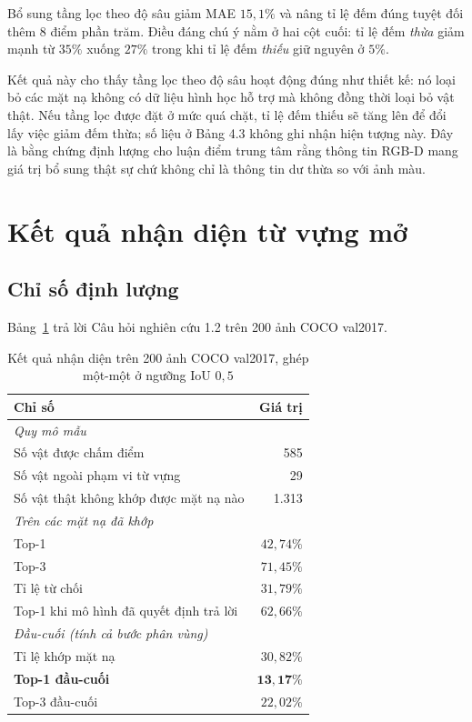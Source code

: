 Bổ sung tầng lọc theo độ sâu giảm MAE $15{,}1\%$ và nâng tỉ lệ đếm đúng tuyệt đối thêm 8 điểm
phần trăm. Điều đáng chú ý nằm ở hai cột cuối: tỉ lệ đếm \emph{thừa} giảm mạnh từ $35\%$ xuống
$27\%$ trong khi tỉ lệ đếm \emph{thiếu} giữ nguyên ở $5\%$.

Kết quả này cho thấy tầng lọc theo độ sâu hoạt động đúng như thiết kế: nó loại bỏ các mặt nạ không có dữ liệu hình học hỗ trợ mà không đồng thời loại bỏ vật thật. Nếu tầng lọc được đặt ở mức quá chặt, tỉ lệ đếm thiếu sẽ tăng lên để đổi lấy việc giảm đếm thừa; số liệu ở Bảng 4.3 không ghi nhận hiện tượng này. Đây
là bằng chứng định lượng cho luận điểm trung tâm rằng thông tin RGB-D mang giá trị bổ sung thật
sự chứ không chỉ là thông tin dư thừa so với ảnh màu.

\section{Kết quả nhận diện từ vựng mở}

\subsection{Chỉ số định lượng}

Bảng~\ref{tab:nhan_dien} trả lời Câu hỏi nghiên cứu 1.2 trên 200 ảnh COCO val2017.

\begin{table}[H]
\centering
\caption{Kết quả nhận diện trên 200 ảnh COCO val2017, ghép một-một ở ngưỡng IoU $0{,}5$}
\label{tab:nhan_dien}
\small
\begin{tabularx}{\textwidth}{X r}
\toprule
\textbf{Chỉ số} & \textbf{Giá trị} \\
\midrule
\multicolumn{2}{l}{\textit{Quy mô mẫu}} \\
Số vật được chấm điểm & 585 \\
Số vật ngoài phạm vi từ vựng & 29 \\
Số vật thật không khớp được mặt nạ nào & 1.313 \\
\midrule
\multicolumn{2}{l}{\textit{Trên các mặt nạ đã khớp}} \\
Top-1 & $42{,}74\%$ \\
Top-3 & $71{,}45\%$ \\
Tỉ lệ từ chối & $31{,}79\%$ \\
Top-1 khi mô hình đã quyết định trả lời & $62{,}66\%$ \\
\midrule
\multicolumn{2}{l}{\textit{Đầu-cuối (tính cả bước phân vùng)}} \\
Tỉ lệ khớp mặt nạ & $30{,}82\%$ \\
\textbf{Top-1 đầu-cuối} & $\mathbf{13{,}17\%}$ \\
Top-3 đầu-cuối & $22{,}02\%$ \\
\bottomrule
\end{tabularx}
\end{table}

